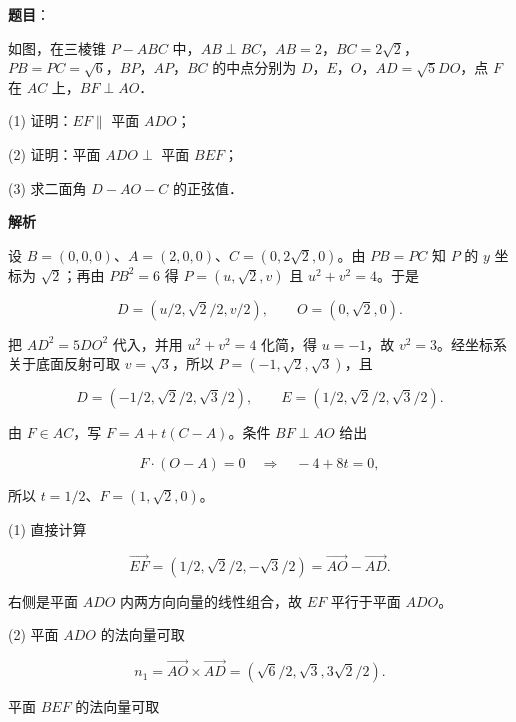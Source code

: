 \begin{answer}

\textbf{题目}：

如图，在三棱锥 $P-ABC$ 中，$AB\perp BC$，$AB=2$，$BC=2\sqrt2$，$PB=PC=\sqrt6$，$BP\text{，}AP\text{，}BC$ 的中点分别为 $D\text{，}E\text{，}O$，$AD=\sqrt5DO$，点 $F$ 在 $AC$ 上，$BF\perp AO$．
\nopagebreak[4]
\begin{center}\end{center}
\nopagebreak[4]
(1) 证明：$EF\parallel$ 平面 $ADO$；

(2) 证明：平面 $ADO\perp$ 平面 $BEF$；

(3) 求二面角 $D-AO-C$ 的正弦值．

\textbf{解析}

设 $B=(0,0,0)$、$A=(2,0,0)$、$C=(0,2\sqrt2,0)$。由 $PB=PC$ 知 $P$ 的 $y$ 坐标为 $\sqrt2$；再由 $PB^2=6$ 得 $P=(u,\sqrt2,v)$ 且 $u^2+v^2=4$。于是

\nopagebreak[4]
\[
D=(u/2,\sqrt2/2,v/2),\qquad O=(0,\sqrt2,0).
\]

把 $AD^2=5DO^2$ 代入，并用 $u^2+v^2=4$ 化简，得 $u=-1$，故 $v^2=3$。经坐标系关于底面反射可取 $v=\sqrt3$，所以 $P=(-1,\sqrt2,\sqrt3)$，且

\nopagebreak[4]
\[
D=(-1/2,\sqrt2/2,\sqrt3/2),\qquad E=(1/2,\sqrt2/2,\sqrt3/2).
\]

由 $F\in AC$，写 $F=A+t(C-A)$。条件 $BF\perp AO$ 给出

\nopagebreak[4]
\[
F\cdot(O-A)=0\quad\Longrightarrow\quad -4+8t=0,
\]

所以 $t=1/2$、$F=(1,\sqrt2,0)$。


(1) 直接计算

\nopagebreak[4]
\[
\overrightarrow{EF}=(1/2,\sqrt2/2,-\sqrt3/2)
=\overrightarrow{AO}-\overrightarrow{AD}.
\]

右侧是平面 $ADO$ 内两方向向量的线性组合，故 $EF$ 平行于平面 $ADO$。


(2) 平面 $ADO$ 的法向量可取

\nopagebreak[4]
\[
n_1=\overrightarrow{AO}\times\overrightarrow{AD}
=(\sqrt6/2,\sqrt3,3\sqrt2/2).
\]

平面 $BEF$ 的法向量可取


\end{answer}
